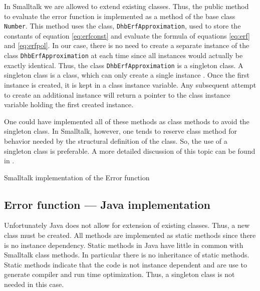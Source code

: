 \documentclass[twoside]{book}
\begin{document}
In Smalltalk we are allowed to extend existing classes. Thus, the
public method to evaluate the error function is implemented as a
method of the base class {\tt Number}. This method uses the class,
{\tt DhbErfApproximation}, used to store the constants of equation
\ref{eq:erfconst} and evaluate the formula of equations
\ref{eq:erf} and \ref{eq:erfpol}. In our case, there is no need to
create a separate instance of the class {\tt DhbErfApproximation}
at each time since all instances would actually be exactly
identical. Thus, the class {\tt DhbErfApproximation} is a
singleton class. A singleton class is a class, which can only
create a single instance \cite{GoF}. Once the first instance is
created, it is kept in a class instance variable. Any subsequent
attempt to create an additional instance will return a pointer to
the class instance variable holding the first created instance.

One could have implemented all of these methods as class methods
to avoid the singleton class. In Smalltalk, however, one tends to
reserve class method for behavior needed by the structural
definition of the class. So, the use of a singleton class is
preferable. A more detailed discussion of this topic can be found
in \cite{StDesPat}.

\begin{listing}
Smalltalk implementation of the Error function
\label{ls:errorFunction}


\end{listing}

\subsection{Error function --- Java implementation}
 Unfortunately Java does not allow for
extension of existing classes. Thus, a new class must be created.
All methods are implemented as static methods since there is no
instance dependency. Static methods in Java have little in common
with Smalltalk class methods. In particular there is no
inheritance of static methods. Static methods indicate that the
code is not instance dependent and are use to generate compiler
and run time optimization. Thus, a singleton class is not needed
in this case.
\end{document}
